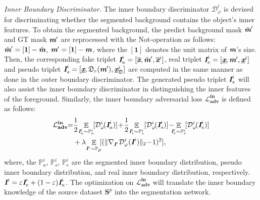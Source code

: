 \documentclass[letterpaper]{article} %
\begin{document}
\emph{Inner Boundary Discriminator.}
The inner boundary discriminator
$\mathcal{D}^i_{\varphi}$ is devised for discriminating whether the segmented
background contains the object's inner features.
To obtain the segmented background, the predict background mask $\tilde{\textbf{\em m}}'$ and GT mask $\textbf{\em m}'$
are reprocessed with the Not-operation as follows: $\tilde{\textbf{\em m}}'=[\mathbf{1}]-\tilde{\textbf{\em m}}$,
$\textbf{\em m}'=[\mathbf{1}]-\textbf{\em m}$, where the $[\mathbf{1}]$
denotes the unit matrix of $\textbf{\em m}$'s size.
Then, the corresponding fake triplet $\textbf{\em I}^i_a=[\overline{\textbf{\em x}},\tilde{\textbf{\em m}}',\overline{\textbf{\em x}}^i]$, real triplet $\textbf{\em I}^i_e=[\underline{\textbf{\em x}},\textbf{\em m}',\underline{\textbf{\em x}}^i]$ and pseudo triplet $\textbf{\em I}^i_s=[\underline{\textbf{\em x}},\mathfrak{D}_r(\textbf{\em m}'),\underline{\textbf{\em x}}^i_{\mathfrak{D}}]$ are computed in the same manner as done in the outer boundary discriminator.
The generated pseudo triplet $\textbf{\em I}^i_s$ will also assist the inner boundary discriminator in distinguishing the inner features of the foreground. Similarly, the inner boundary adversarial loss $\mathbf{\mathcal{L}^{in}_{adv}}$ is defined as follows:
\begin{equation}\label{eq5}
\begin{split}
\mathbf{\mathcal{L}^{in}_{adv}}\!\!= & \frac{1}{2}\!\mathop{\mathbb{E}}\limits_{\mathbi{I}^i_a \sim \mathbb{P}^i_a}\![\mathcal{D}^i_{\varphi}\!(\mathbi{I}^i_a)]\!+\!
\frac{1}{2}\!\mathop{\mathbb{E}}\limits_{\mathbi{I}^i_s \sim \mathbb{P}^i_s} [\mathcal{D}^i_{\varphi}\!(\mathbi{I}^i_s)]\!-\!\!\!\!\mathop{\mathbb{E}}\limits_{\mathbi{I}^i_e \sim \mathbb{P}^i_e}\![\mathcal{D}^i_{\varphi}\!(\mathbi{I}^i_e)]\\
& + \lambda \!\mathop{\mathbb{E}}\limits_{\mathbi{I}^i\sim \mathbb{P}_{\mathbi{I}^i}}\!\![(\|\nabla_{\mathbi{I}^i} \mathcal{D}^i_{\varphi}(\mathbi{I}^i)\|_{2}\!-\!1)^2],
\end{split}
\end{equation}
where, the $ \mathbb{P}^i_a$, $\mathbb{P}^i_s$, $\mathbb{P}^i_e$ are the segmented inner boundary distribution, pseudo inner boundary distribution, and real inner boundary distribution, respectively.
$\textbf{\em I}^i=\varepsilon \textbf{\em I}^i_e+(1-\varepsilon)\textbf{\em I}^i_a$. The optimization on $\mathbf{\mathcal{L}^{in}_{adv}}$ will translate the inner boundary knowledge of the source dataset $\mathbf{S}^p$ into the segmentation network.
\end{document}
